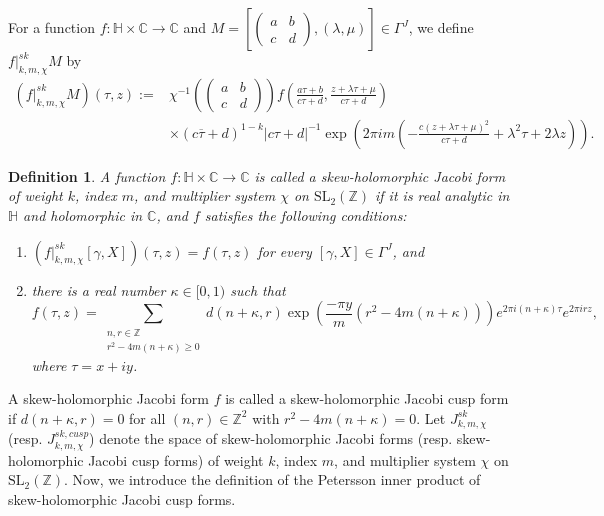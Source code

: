 \documentclass[11pt]{amsart}
\newtheorem{dfn}[thm]{Definition}
\theoremstyle{definition}
\theoremstyle{remark}
\numberwithin{equation}{section}
\newcommand{\sm}{\left(\begin{smallmatrix}}
\newcommand{\esm}{\end{smallmatrix}\right)}
\renewcommand{\(}{\left(}
\renewcommand{\)}{\right)}
\def\ZZ{\mathbb{Z}}
\def\SL{\mathrm{SL}}
\begin{document}
For a function $f:\mathbb{H}\times \mathbb{C}\to \mathbb{C}$ and $M=[\sm a & b\\
c & d \esm , (\lambda,\mu)]\in \Gamma^{J}$, we define $f|^{sk}_{k,m,\chi}M$ by
\begin{equation*}
    \begin{aligned}
    \left(f|^{sk}_{k,m,\chi}M\right)(\tau,z)
    :=&\chi^{-1}\left(\left(\begin{smallmatrix}
    a & b\\
    c & d
    \end{smallmatrix}\right)\right)f\left(\frac{a\tau+b}{c\tau+d}, \frac{z+\lambda \tau+\mu}{c\tau+d}\right)\\ &\times(c\overline{\tau}+d)^{1-k}|c\tau+d|^{-1}\exp\left(2\pi i m\left(-\frac{c(z+\lambda\tau+\mu)^2}{c\tau+d} +\lambda^2\tau+2\lambda z\right)\right).
    \end{aligned}
\end{equation*}

\begin{dfn}\label{def : def of skew-Jacobi form}
    A function $f:\mathbb{H}\times \mathbb{C}\to \mathbb{C}$ is called a skew-holomorphic Jacobi form of weight $k$, index $m$, and multiplier system $\chi$ on $\mathrm{SL}_{2}(\mathbb{Z})$ if it is real analytic in $\mathbb{H}$ and holomorphic in $\mathbb{C}$, and $f$ satisfies the following conditions:
    \begin{enumerate}
        \item $\left(f|^{sk}_{k,m,\chi}[\gamma,X]\right)(\tau,z)=f(\tau,z)$ for every $[\gamma,X]\in \Gamma^{J}$, and 
        \item there is a real number $\kappa\in [0,1)$ such that 
        \[ f(\tau,z)= \sum_{\substack{n,r\in \ZZ \\ r^2-4m(n+\kappa)\geq 0}}d(n+\kappa,r)\exp\left(\frac{-\pi y}{m}\left(r^2-4m(n+\kappa)\right)\right)e^{2\pi i(n+\kappa)\tau}e^{2\pi i rz},\]
        where $\tau=x+iy$.
    \end{enumerate}
\end{dfn}

A skew-holomorphic Jacobi form $f$ is called a skew-holomorphic Jacobi cusp form if $d(n+\kappa,r)=0$ for all $(n,r)\in \mathbb{Z}^2$ with $r^2-4m(n+\kappa)=0$. 
Let $J^{sk}_{k,m,\chi}$ (resp. $J^{sk,cusp}_{k,m,\chi}$) denote the space of skew-holomorphic Jacobi forms (resp. skew-holomorphic Jacobi cusp forms) of weight $k$, index $m$, and multiplier system $\chi$ on $\SL_2(\mathbb{Z})$.
Now, we introduce the definition of the Petersson inner product of skew-holomorphic Jacobi cusp forms. 
\end{document}
